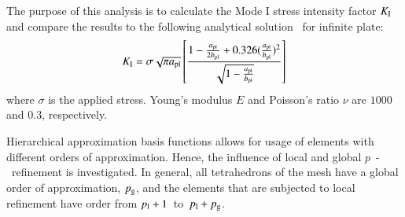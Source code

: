 \documentclass[11pt]{acmeArticle}
\numberwithin{equation}{section}
\begin{document}
The purpose of this analysis is to calculate the Mode I stress intensity factor $ K_{\rm I} $ and compare the results to the following analytical solution~\citep{rooke1976compendium} for infinite plate:
\begin{equation}\label{eq:frac_analytical}
K_{\rm I}=\sigma \sqrt{\pi a_{\rm {pl}}} \left[  \frac{1 - \frac{a_{\rm {pl}}}{2b_{\rm {pl}}} + 0.326 (\frac{a_{\rm {pl}}}{b_{\rm {pl}}})^2 }{\sqrt{1-\frac{a_{\rm {pl}}}{b_{\rm {pl}}}}}  \right]
\end{equation}
where $\sigma $ is the applied stress. 
Young's modulus $E$ and Poisson's ratio $\nu$ are $1000$ and $0.3$, respectively. 


Hierarchical approximation basis functions allows for usage of elements with different orders of approximation. 
Hence, the influence of local and global $p$~-~refinement is investigated.
In general, all tetrahedrons of the mesh have a global order of approximation, $p_{\rm g}$, and the elements that are subjected to local refinement have order from $p_{\rm{l}} + 1$~to~$p_{\rm{l}} + p_{\rm{g}}$.
\end{document}
